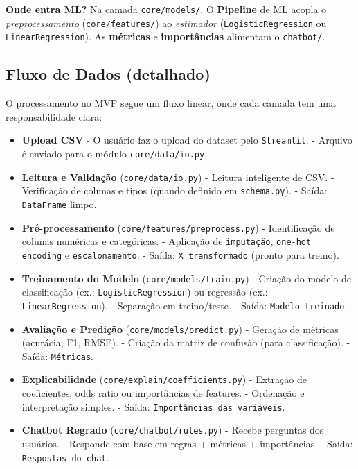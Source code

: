 \documentclass[12pt,a4paper]{article}
\begin{document}
\textbf{Onde entra ML?} Na camada \texttt{core/models/}. O \textbf{Pipeline} de ML acopla o \textit{preprocessamento} (\texttt{core/features/}) ao \textit{estimador} (\texttt{LogisticRegression} ou \texttt{LinearRegression}). As \textbf{métricas} e \textbf{importâncias} alimentam o \texttt{chatbot/}.

\subsection{Fluxo de Dados (detalhado)}

O processamento no MVP segue um fluxo linear, onde cada camada tem uma responsabilidade clara:

\begin{itemize}
  \item \textbf{Upload CSV}  
    - O usuário faz o upload do dataset pelo \texttt{Streamlit}.  
    - Arquivo é enviado para o módulo \texttt{core/data/io.py}.  

  \item \textbf{Leitura e Validação} (\texttt{core/data/io.py})  
    - Leitura inteligente de CSV.  
    - Verificação de colunas e tipos (quando definido em \texttt{schema.py}).  
    - Saída: \texttt{DataFrame} limpo.  

  \item \textbf{Pré-processamento} (\texttt{core/features/preprocess.py})  
    - Identificação de colunas numéricas e categóricas.  
    - Aplicação de \texttt{imputação}, \texttt{one-hot encoding} e \texttt{escalonamento}.  
    - Saída: \texttt{X transformado} (pronto para treino).  

  \item \textbf{Treinamento do Modelo} (\texttt{core/models/train.py})  
    - Criação do modelo de classificação (ex.: \texttt{LogisticRegression}) ou regressão (ex.: \texttt{LinearRegression}).  
    - Separação em treino/teste.  
    - Saída: \texttt{Modelo treinado}.  

  \item \textbf{Avaliação e Predição} (\texttt{core/models/predict.py})  
    - Geração de métricas (acurácia, F1, RMSE).  
    - Criação da matriz de confusão (para classificação).  
    - Saída: \texttt{Métricas}.  

  \item \textbf{Explicabilidade} (\texttt{core/explain/coefficients.py})  
    - Extração de coeficientes, odds ratio ou importâncias de features.  
    - Ordenação e interpretação simples.  
    - Saída: \texttt{Importâncias das variáveis}.  

  \item \textbf{Chatbot Regrado} (\texttt{core/chatbot/rules.py})  
    - Recebe perguntas dos usuários.  
    - Responde com base em regras + métricas + importâncias.  
    - Saída: \texttt{Respostas do chat}.  
\end{itemize}
\end{document}
